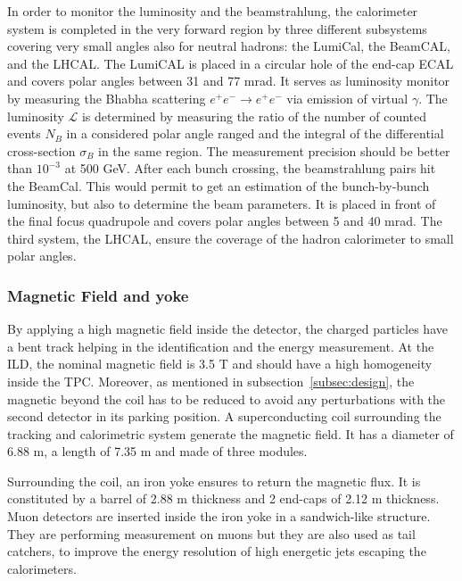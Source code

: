       In order to monitor the luminosity and the beamstrahlung, the calorimeter system is completed in the very forward region by three different subsystems covering very small angles also for neutral hadrons: the LumiCal, the BeamCAL, and the \gls{LHCAL}.
      The LumiCAL is placed in a circular hole of the end-cap \gls{ECAL} and covers polar angles between 31 and 77 mrad. 
      It serves as luminosity monitor by measuring the Bhabha scattering $e^+e^- \rightarrow e^+e^-$ via emission of virtual $\gamma$.
      The luminosity $\mathcal{L}$ is determined by measuring  the ratio of the number of counted events $N_B$ in a considered polar angle ranged and the integral of the differential cross-section $\sigma_B$ in the same region.
      The measurement precision should be better than $10^{-3}$ at 500 GeV.
      After each bunch crossing, the beamstrahlung pairs hit the BeamCal.
      This would permit to get an estimation of the bunch-by-bunch luminosity, but also to determine the beam parameters.
      It is placed in front of the final focus quadrupole and covers polar angles between 5 and 40 mrad.
      The third system, the \gls{LHCAL}, ensure the coverage of the hadron calorimeter to small polar angles. 

      \subsubsection{Magnetic Field and yoke}

     By applying a high magnetic field inside the detector, the charged particles have a bent track helping in the identification and the energy measurement.
     At the \gls{ILD}, the nominal magnetic field is 3.5 T and should have a high homogeneity inside the TPC.
     Moreover, as mentioned in subsection~\ref{subsec:design}, the magnetic beyond the coil has to be reduced to avoid any perturbations with the second detector in its parking position.
     A superconducting coil surrounding the tracking and calorimetric system generate the magnetic field.
     It has a diameter of 6.88 m, a length of 7.35 m and made of three modules.

     Surrounding the coil, an iron yoke ensures to return the magnetic flux. 
     It is constituted by a barrel of 2.88 m thickness and 2 end-caps of 2.12 m thickness.
     Muon detectors are inserted inside the iron yoke in a sandwich-like structure.
     They are performing measurement on muons but they are also used as tail catchers, to improve the energy resolution of high energetic jets escaping the calorimeters. 


